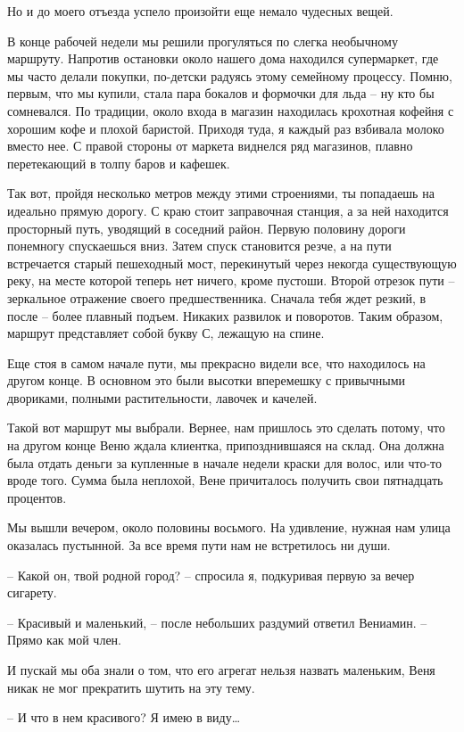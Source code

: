 \documentclass[
]{book}
\begin{document}
Но и до моего отъезда успело произойти еще немало чудесных вещей.

В конце рабочей недели мы решили прогуляться по слегка необычному маршруту. Напротив остановки около нашего дома находился супермаркет, где мы часто делали покупки, по-детски радуясь этому семейному процессу. Помню, первым, что мы купили, стала пара бокалов и формочки для льда -- ну кто бы сомневался. По традиции, около входа в магазин находилась крохотная кофейня с хорошим кофе и плохой баристой. Приходя туда, я каждый раз взбивала молоко вместо нее. С правой стороны от маркета виднелся ряд магазинов, плавно перетекающий в толпу баров и кафешек.

Так вот, пройдя несколько метров между этими строениями, ты попадаешь на идеально прямую дорогу. С краю стоит заправочная станция, а за ней находится просторный путь, уводящий в соседний район. Первую половину дороги понемногу спускаешься вниз. Затем спуск становится резче, а на пути встречается старый пешеходный мост, перекинутый через некогда существующую реку, на месте которой теперь нет ничего, кроме пустоши. Второй отрезок пути -- зеркальное отражение своего предшественника. Сначала тебя ждет резкий, в после -- более плавный подъем. Никаких развилок и поворотов. Таким образом, маршрут представляет собой букву С, лежащую на спине.

Еще стоя в самом начале пути, мы прекрасно видели все, что находилось на другом конце. В основном это были высотки вперемешку с привычными двориками, полными растительности, лавочек и качелей.

Такой вот маршрут мы выбрали. Вернее, нам пришлось это сделать потому, что на другом конце Веню ждала клиентка, припозднившаяся на склад. Она должна была отдать деньги за купленные в начале недели краски для волос, или что-то вроде того. Сумма была неплохой, Вене причиталось получить свои пятнадцать процентов.

Мы вышли вечером, около половины восьмого. На удивление, нужная нам улица оказалась пустынной. За все время пути нам не встретилось ни души.

-- Какой он, твой родной город? -- спросила я, подкуривая первую за вечер сигарету.

-- Красивый и маленький, -- после небольших раздумий ответил Вениамин. -- Прямо как мой член.

И пускай мы оба знали о том, что его агрегат нельзя назвать маленьким, Веня никак не мог прекратить шутить на эту тему.

-- И что в нем красивого? Я имею в виду\ldots{}
\end{document}
